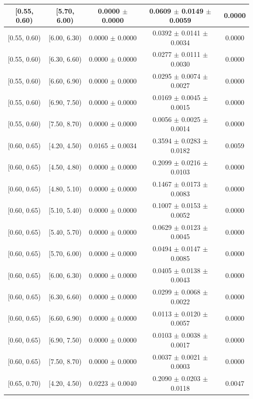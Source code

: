 \begin{longtable}{|c|c|c|c|c|}
\hline
[0.55, 0.60) & [5.70, 6.00) & 0.0000 $\pm$ 0.0000 & 0.0609 $\pm$ 0.0149 $\pm$ 0.0059 & 0.0000 \\ 
\hline
[0.55, 0.60) & [6.00, 6.30) & 0.0000 $\pm$ 0.0000 & 0.0392 $\pm$ 0.0141 $\pm$ 0.0034 & 0.0000 \\ 
\hline
[0.55, 0.60) & [6.30, 6.60) & 0.0000 $\pm$ 0.0000 & 0.0277 $\pm$ 0.0111 $\pm$ 0.0030 & 0.0000 \\ 
\hline
[0.55, 0.60) & [6.60, 6.90) & 0.0000 $\pm$ 0.0000 & 0.0295 $\pm$ 0.0074 $\pm$ 0.0027 & 0.0000 \\ 
\hline
[0.55, 0.60) & [6.90, 7.50) & 0.0000 $\pm$ 0.0000 & 0.0169 $\pm$ 0.0045 $\pm$ 0.0015 & 0.0000 \\ 
\hline
[0.55, 0.60) & [7.50, 8.70) & 0.0000 $\pm$ 0.0000 & 0.0056 $\pm$ 0.0025 $\pm$ 0.0014 & 0.0000 \\ 
\hline
[0.60, 0.65) & [4.20, 4.50) & 0.0165 $\pm$ 0.0034 & 0.3594 $\pm$ 0.0283 $\pm$ 0.0182 & 0.0059 \\ 
\hline
[0.60, 0.65) & [4.50, 4.80) & 0.0000 $\pm$ 0.0000 & 0.2099 $\pm$ 0.0216 $\pm$ 0.0103 & 0.0000 \\ 
\hline
[0.60, 0.65) & [4.80, 5.10) & 0.0000 $\pm$ 0.0000 & 0.1467 $\pm$ 0.0173 $\pm$ 0.0083 & 0.0000 \\ 
\hline
[0.60, 0.65) & [5.10, 5.40) & 0.0000 $\pm$ 0.0000 & 0.1007 $\pm$ 0.0153 $\pm$ 0.0052 & 0.0000 \\ 
\hline
[0.60, 0.65) & [5.40, 5.70) & 0.0000 $\pm$ 0.0000 & 0.0629 $\pm$ 0.0123 $\pm$ 0.0045 & 0.0000 \\ 
\hline
[0.60, 0.65) & [5.70, 6.00) & 0.0000 $\pm$ 0.0000 & 0.0494 $\pm$ 0.0147 $\pm$ 0.0085 & 0.0000 \\ 
\hline
[0.60, 0.65) & [6.00, 6.30) & 0.0000 $\pm$ 0.0000 & 0.0405 $\pm$ 0.0138 $\pm$ 0.0043 & 0.0000 \\ 
\hline
[0.60, 0.65) & [6.30, 6.60) & 0.0000 $\pm$ 0.0000 & 0.0299 $\pm$ 0.0068 $\pm$ 0.0022 & 0.0000 \\ 
\hline
[0.60, 0.65) & [6.60, 6.90) & 0.0000 $\pm$ 0.0000 & 0.0113 $\pm$ 0.0120 $\pm$ 0.0057 & 0.0000 \\ 
\hline
[0.60, 0.65) & [6.90, 7.50) & 0.0000 $\pm$ 0.0000 & 0.0103 $\pm$ 0.0038 $\pm$ 0.0017 & 0.0000 \\ 
\hline
[0.60, 0.65) & [7.50, 8.70) & 0.0000 $\pm$ 0.0000 & 0.0037 $\pm$ 0.0021 $\pm$ 0.0003 & 0.0000 \\ 
\hline
[0.65, 0.70) & [4.20, 4.50) & 0.0223 $\pm$ 0.0040 & 0.2090 $\pm$ 0.0203 $\pm$ 0.0118 & 0.0047 \\ 

\end{longtable}
